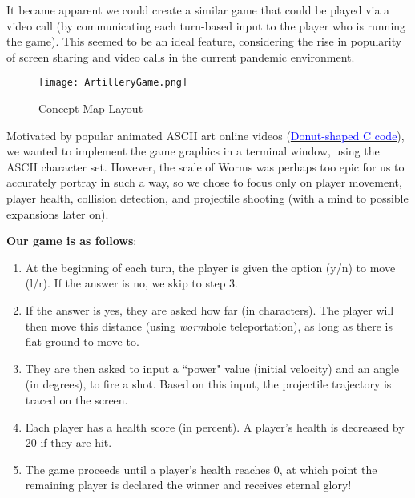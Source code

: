 \documentclass[]{article}
\begin{document}
\vspace{3mm}

It became apparent we could create a similar game that could be played via a video call (by communicating each turn-based input to the player who is running the game). This seemed to be an ideal feature, considering the rise in popularity of screen sharing and video calls in the current pandemic environment.

\vspace{3mm}

\begin{wrapfigure}[9]{L}{0.53\textwidth}
\centering
    \centering
    \vspace{-3mm}
\texttt{[image: ArtilleryGame.png]}

  \caption{\label{fig2 :}Concept Map Layout}
    \vspace{-4mm}
\end{wrapfigure}



Motivated by popular animated ASCII art online videos (\href{https://www.youtube.com/watch?v=DEqXNfs_HhY}{\textcolor{blue}{Donut-shaped C code}}), we wanted to implement the game graphics in a terminal window, using the ASCII character set. However, the scale of Worms was perhaps too epic for us to accurately portray in such a way, so we chose to focus only on player movement, player health, collision detection, and projectile shooting (with a mind to possible expansions later on).

\vspace{10mm}

\noindent \textbf{Our game is as follows}:

\begin{enumerate}
    \item At the beginning of each turn, the player is given the option (y/n) to move (l/r). If the answer is no, we skip to step 3.
    \item If the answer is yes, they are asked how far (in characters). The player will then move this distance (using \textit{worm}hole teleportation), as long as there is flat ground to move to.
    \item They are then asked to input a ``power" value (initial velocity) and an angle (in degrees), to fire a shot. Based on this input, the projectile trajectory is traced on the screen.
    \item Each player has a health score (in percent). A player's health is decreased by 20 if they are hit.
    \item The game proceeds until a player's health reaches 0, at which point the remaining player is declared the winner and receives eternal glory!
\end{enumerate}
\newpage
\end{document}
